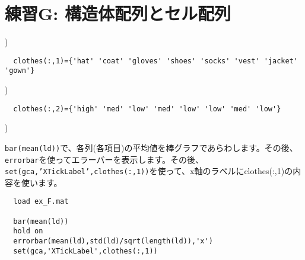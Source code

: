\documentclass{jsarticle}
\begin{document}
\bigskip


\section{練習G: 構造体配列とセル配列}

)

\begin{verbatim}
  clothes(:,1)={'hat' 'coat' 'gloves' 'shoes' 'socks' 'vest' 'jacket' 'gown'}
\end{verbatim}

)

\begin{verbatim}
  clothes(:,2)={'high' 'med' 'low' 'med' 'low' 'low' 'med' 'low'}
\end{verbatim}


)

\begin{screen}
{\tt bar(mean(ld))}で、各列(各項目)の平均値を棒グラフであらわします。その後、{\tt errorbar}を使ってエラーバーを表示します。その後、{\tt set(gca,'XTickLabel',clothes(:,1))}を使って、x軸のラベルにclothes(:,1)の内容を使います。
\end{screen}

\begin{verbatim}
  load ex_F.mat

  bar(mean(ld))
  hold on
  errorbar(mean(ld),std(ld)/sqrt(length(ld)),'x')
  set(gca,'XTickLabel',clothes(:,1))
\end{verbatim}



\end{document}

